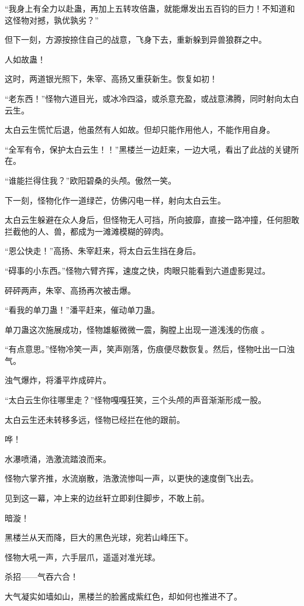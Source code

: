 \begin{this_body}
“我身上有全力以赴蛊，再加上五转攻倍蛊，就能爆发出五百钧的巨力！不知道和这怪物对撼，孰优孰劣？”

但下一刻，方源按捺住自己的战意，飞身下去，重新躲到异兽狼群之中。

人如故蛊！

这时，两道银光照下，朱宰、高扬又重获新生。恢复如初！

“老东西！”怪物六道目光，或冰冷四溢，或杀意充盈，或战意沸腾，同时射向太白云生。

太白云生慌忙后退，他虽然有人如故。但却只能作用他人，不能作用自身。

“全军有令，保护太白云生！！”黑楼兰一边赶来，一边大吼，看出了此战的关键所在。

“谁能拦得住我？”欧阳碧桑的头颅。傲然一笑。

下一刻，怪物化作一道绿芒，仿佛闪电一样，射向太白云生。

太白云生躲避在众人身后，但怪物无人可挡，所向披靡，直接一路冲撞，任何胆敢拦截他的人、兽，都成为一滩滩模糊的碎肉。

“恩公快走！”高扬、朱宰赶来，将太白云生挡在身后。

“碍事的小东西。”怪物六臂齐挥，速度之快，肉眼只能看到六道虚影晃过。

砰砰两声，朱宰、高扬再次被击爆。

“看我的单刀蛊！”潘平赶来，催动单刀蛊。

单刀蛊这次施展成功，怪物雄躯微微一震，胸膛上出现一道浅浅的伤痕 。

“有点意思。”怪物冷笑一声，笑声刚落，伤痕便尽数恢复。然后，怪物吐出一口浊气。

浊气爆炸，将潘平炸成碎片。

“太白云生你往哪里走？”怪物嘎嘎狂笑，三个头颅的声音渐渐形成一股。

太白云生还未转移多远，怪物已经拦在他的跟前。

哗！

水瀑喷涌，浩激流踏浪而来。

怪物六掌齐推，水流崩散，浩激流惨叫一声，以更快的速度倒飞出去。

见到这一幕，冲上来的边丝轩立即刹住脚步，不敢上前。

暗漩！

黑楼兰从天而降，巨大的黑色光球，宛若山峰压下。

怪物大吼一声，六手层爪，遥遥对准光球。

杀招——气吞六合！

大气凝实如墙如山，黑楼兰的脸酱成紫红色，却如何也推进不了。


\end{this_body}
